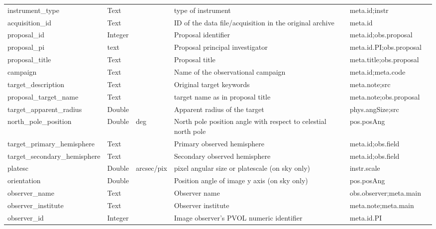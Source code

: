 \documentclass[11pt,a4paper]{ivoa}
\begin{document}
\begin{landscape}
\begin{longtable}{p{3.5cm}p{0.5cm}p{1.4cm}p{1cm}p{7cm}p{5cm}}
instrument\_type&Text&&type of instrument&meta.id;instr&\\

acquisition\_id&Text&&ID of the data file/acquisition in the original archive&meta.id&\\

proposal\_id&Integer&&Proposal identifier&meta.id;obs.proposal&\\

proposal\_pi&text&&Proposal principal investigator&meta.id.PI;obs.proposal&\\

proposal\_title&Text&&Proposal title&meta.title;obs.proposal&\\

campaign&Text&&Name of the observational campaign&meta.id;meta.code&\\

target\_description&Text&&Original target keywords&meta.note;src&\\

proposal\_target\_name&Text&&target name as in proposal title&meta.note;obs.proposal&\\

target\_apparent\_radius&Double&&Apparent radius of the target&phys.angSize;src&\\

north\_pole\_position&Double&deg&North pole position angle with respect to celestial north pole&pos.posAng&\\

target\_primary\_hemisphere&Text&&Primary observed hemisphere&meta.id;obs.field&\\

target\_secondary\_hemisphere&Text&&Secondary observed hemisphere&meta.id;obs.field&\\

platesc&Double&arcsec/pix&pixel angular size or platescale (on sky only)&instr.scale&\\

orientation&Double&&Position angle of image y axis (on sky only)&pos.posAng&\\

observer\_name&Text&&Observer name&obs.observer;meta.main&\\

observer\_institute&Text&&Observer institute&meta.note;meta.main&\\

observer\_id&Integer&&Image observer's PVOL numeric identifier&meta.id.PI&\\


\end{longtable}
\end{landscape}
\end{document}
